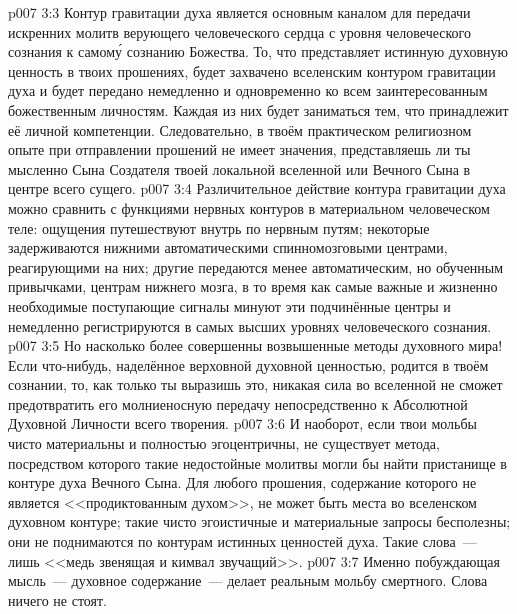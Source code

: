 \vs p007 3:3 \pc Контур гравитации духа является основным каналом для передачи искренних молитв верующего человеческого сердца с уровня человеческого сознания к самом\'у сознанию Божества. То, что представляет истинную духовную ценность в твоих прошениях, будет захвачено вселенским контуром гравитации духа и будет передано немедленно и одновременно ко всем заинтересованным божественным личностям. Каждая из них будет заниматься тем, что принадлежит её личной компетенции. Следовательно, в твоём практическом религиозном опыте при отправлении прошений не имеет значения, представляешь ли ты мысленно Сына Создателя твоей локальной вселенной или Вечного Сына в центре всего сущего.
\vs p007 3:4 \pc Различительное действие контура гравитации духа можно сравнить с функциями нервных контуров в материальном человеческом теле: ощущения путешествуют внутрь по нервным путям; некоторые задерживаются нижними автоматическими спинномозговыми центрами, реагирующими на них; другие передаются менее автоматическим, но обученным привычками, центрам нижнего мозга, в то время как самые важные и жизненно необходимые поступающие сигналы минуют эти подчинённые центры и немедленно регистрируются в самых высших уровнях человеческого сознания.
\vs p007 3:5 Но насколько более совершенны возвышенные методы духовного мира! Если что\hyp{}нибудь, наделённое верховной духовной ценностью, родится в твоём сознании, то, как только ты выразишь это, никакая сила во вселенной не сможет предотвратить его молниеносную передачу непосредственно к Абсолютной Духовной Личности всего творения.
\vs p007 3:6 И наоборот, если твои мольбы чисто материальны и полностью эгоцентричны, не существует метода, посредством которого такие недостойные молитвы могли бы найти пристанище в контуре духа Вечного Сына. Для любого прошения, содержание которого не является <<продиктованным духом>>, не может быть места во вселенском духовном контуре; такие чисто эгоистичные и материальные запросы бесполезны; они не поднимаются по контурам истинных ценностей духа. Такие слова~--- лишь <<медь звенящая и кимвал звучащий>>.
\vs p007 3:7 Именно побуждающая мысль~--- духовное содержание~--- делает реальным мольбу смертного. Слова ничего не стоят.
